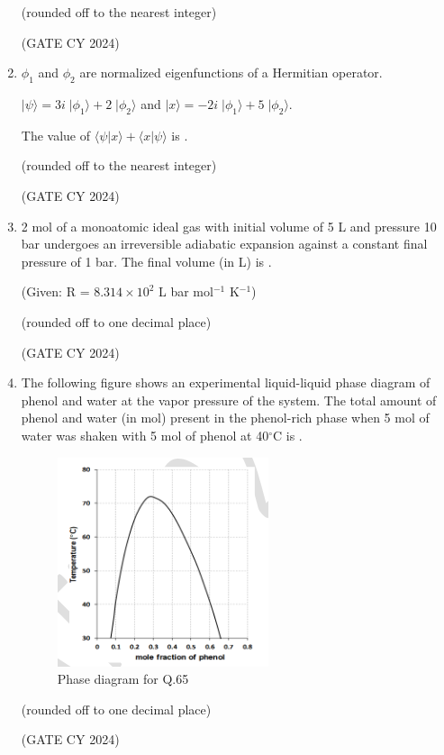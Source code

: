 \documentclass[12pt]{article}
\begin{document}
\begin{enumerate}
(rounded off to the nearest integer)

\hfill (GATE CY 2024)


\item $\phi_1$ and $\phi_2$ are normalized eigenfunctions of a Hermitian operator.

$|\psi\rangle = 3i\;|\phi_1\rangle + 2\;|\phi_2\rangle$ and $|x\rangle = -2i\;|\phi_1\rangle + 5\;|\phi_2\rangle$.

The value of $\langle \psi | x \rangle + \langle x | \psi \rangle$ is \underline{\hspace{2cm}}.

(rounded off to the nearest integer)

\hfill (GATE CY 2024)

\item 2 mol of a monoatomic ideal gas with initial volume of 5 L and pressure 10 bar undergoes an irreversible adiabatic expansion against a constant final pressure of 1 bar. The final volume (in L) is \underline{\hspace{2cm}}.

(Given: R = $8.314 \times 10^{2}$ L bar mol$^{-1}$ K$^{-1}$)

(rounded off to one decimal place)

\hfill (GATE CY 2024)

\item The following figure shows an experimental liquid-liquid phase diagram of phenol and water at the vapor pressure of the system. The total amount of phenol and water (in mol) present in the phenol-rich phase when 5 mol of water was shaken with 5 mol of phenol at 40$^{\circ}$C is \underline{\hspace{2cm}}.

\begin{figure}[H]
\centering
\includegraphics[width=0.45\columnwidth]{figs/q65.png}
\caption{Phase diagram for Q.65}
\label{fig:q65}
\end{figure}

(rounded off to one decimal place)

\hfill (GATE CY 2024)



\end{enumerate}
\end{document}
